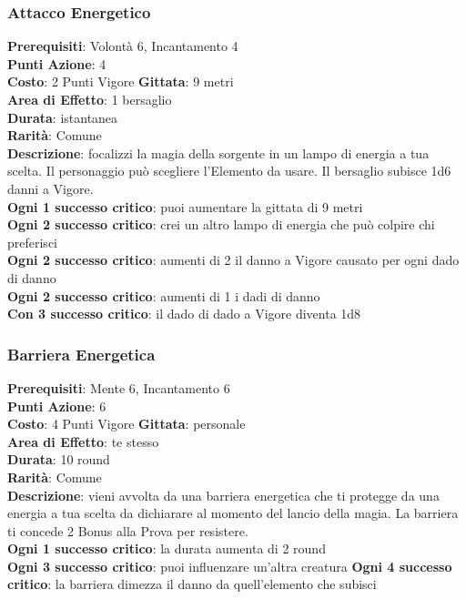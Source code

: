 \documentclass[12pt,a4paper,twoside,openany]{book}
\begin{document}
\begin{multicols}{2}


\subsubsection*{Attacco Energetico}
\textbf{Prerequisiti}: Volontà 6, Incantamento 4\\
\textbf{Punti Azione}: 4\\
\textbf{Costo}: 2 Punti Vigore
\textbf{Gittata}: 9 metri\\
\textbf{Area di Effetto}: 1 bersaglio\\
\textbf{Durata}: istantanea\\
\textbf{Rarità}: Comune\\
\textbf{Descrizione}: focalizzi la magia della sorgente in un lampo di energia a tua scelta. Il personaggio può scegliere l'Elemento da usare.
Il bersaglio subisce 1d6 danni a Vigore.\\
\textbf{Ogni 1 successo critico}: puoi aumentare la gittata di 9 metri\\
\textbf{Ogni 2 successo critico}: crei un altro lampo di energia che può colpire chi preferisci\\
\textbf{Ogni 2 successo critico}: aumenti di 2 il danno a Vigore causato per ogni dado di danno\\
\textbf{Ogni 2 successo critico}: aumenti di 1 i dadi di danno\\
\textbf{Con 3 successo critico}: il dado di dado a Vigore diventa 1d8

\subsubsection*{Barriera Energetica}
\textbf{Prerequisiti}: Mente 6, Incantamento 6\\
\textbf{Punti Azione}: 6\\
\textbf{Costo}: 4 Punti Vigore
\textbf{Gittata}: personale\\
\textbf{Area di Effetto}: te stesso\\
\textbf{Durata}: 10 round\\
\textbf{Rarità}: Comune\\
\textbf{Descrizione}: vieni avvolta da una barriera energetica che ti protegge da una energia a tua scelta da dichiarare al momento del lancio della magia. La barriera ti concede 2 Bonus alla Prova per resistere.\\
\textbf{Ogni 1 successo critico}: la durata aumenta di 2 round\\
\textbf{Ogni 3 successo critico}: puoi influenzare un'altra creatura
\textbf{Ogni 4 successo critico}: la barriera dimezza il danno da quell'elemento che subisci



\end{multicols}
\end{document}
